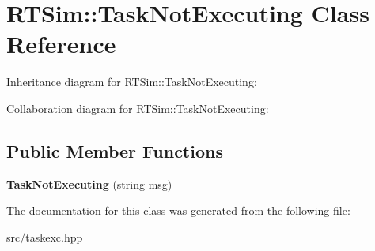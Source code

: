 \hypertarget{classRTSim_1_1TaskNotExecuting}{}\section{R\+T\+Sim\+:\+:Task\+Not\+Executing Class Reference}
\label{classRTSim_1_1TaskNotExecuting}


Inheritance diagram for R\+T\+Sim\+:\+:Task\+Not\+Executing\+:


Collaboration diagram for R\+T\+Sim\+:\+:Task\+Not\+Executing\+:
\subsection*{Public Member Functions}
\begin{DoxyCompactItemize}
\item 
{\bfseries Task\+Not\+Executing} (string msg)\hypertarget{classRTSim_1_1TaskNotExecuting_affbece29e342f93fd798637f71048b00}{}\label{classRTSim_1_1TaskNotExecuting_affbece29e342f93fd798637f71048b00}

\end{DoxyCompactItemize}


The documentation for this class was generated from the following file\+:\begin{DoxyCompactItemize}
\item 
src/taskexc.\+hpp\end{DoxyCompactItemize}
